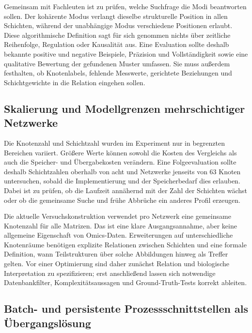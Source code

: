 \documentclass[a4paper,12pt, twoside]{report}
\theoremstyle{definition}
\begin{document}
Gemeinsam mit Fachleuten ist zu prüfen, welche Suchfrage die Modi beantworten sollen. Der kohärente Modus verlangt dieselbe strukturelle Position in allen Schichten, während der unabhängige Modus verschiedene Positionen erlaubt. Diese algorithmische Definition sagt für sich genommen nichts über zeitliche Reihenfolge, Regulation oder Kausalität aus. Eine Evaluation sollte deshalb bekannte positive und negative Beispiele, Präzision und Vollständigkeit sowie eine qualitative Bewertung der gefundenen Muster umfassen. Sie muss außerdem festhalten, ob Knotenlabels, fehlende Messwerte, gerichtete Beziehungen und Schichtgewichte in die Relation eingehen sollen.

\subsection{Skalierung und Modellgrenzen mehrschichtiger Netzwerke}

Die Knotenzahl und Schichtzahl wurden im Experiment nur in begrenzten Bereichen variiert. Größere Werte können sowohl die Kosten des Vergleichs als auch die Speicher- und Übergabekosten verändern. Eine Folgeevaluation sollte deshalb Schichtzahlen oberhalb von acht und Netzwerke jenseits von $63$ Knoten untersuchen, sobald die Implementierung und der Speicherbedarf dies erlauben. Dabei ist zu prüfen, ob die Laufzeit annähernd mit der Zahl der Schichten wächst oder ob die gemeinsame Suche und frühe Abbrüche ein anderes Profil erzeugen.

Die aktuelle Versuchskonstruktion verwendet pro Netzwerk eine gemeinsame Knotenzahl für alle Matrizen. Das ist eine klare Ausgangsannahme, aber keine allgemeine Eigenschaft von Omics-Daten. Erweiterungen auf unterschiedliche Knotenräume benötigen explizite Relationen zwischen Schichten und eine formale Definition, wann Teilstrukturen über solche Abbildungen hinweg als Treffer gelten. Vor einer Optimierung sind daher zunächst Relation und biologische Interpretation zu spezifizieren; erst anschließend lassen sich notwendige Datenbankfilter, Komplexitätsaussagen und Ground-Truth-Tests korrekt ableiten.

\subsection{Batch- und persistente Prozessschnittstellen als Übergangslösung}
\label{sec:batch_cli}
\end{document}
